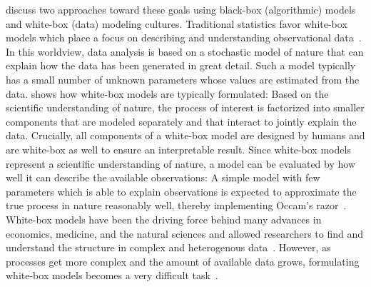 \Textcite{breiman_statistical_2001,shmueli_explain_2010} discuss two approaches toward these goals using black-box (algorithmic) models and white-box (data) modeling cultures.
Traditional statistics favor white-box models which place a focus on describing and understanding observational data~\parencite{andrew_gelman_bayesian_2013,casella_statistical_2002,cox_planning_1958}.
In this worldview, data analysis is based on a stochastic model of nature that can explain how the data has been generated in great detail.
Such a model typically has a small number of unknown parameters whose values are estimated from the data.
 shows how white-box models are typically formulated:
Based on the scientific understanding of nature, the process of interest is factorized into smaller components that are modeled separately and that interact to jointly explain the data.
Crucially, all components of a white-box model are designed by humans and are white-box as well to ensure an interpretable result.
Since white-box models represent a scientific understanding of nature, a model can be evaluated by how well it can describe the available observations:
A simple model with few parameters which is able to explain observations is expected to approximate the true process in nature reasonably well, thereby implementing Occam's razor~\parencite{thorburn_occams_1915}.
White-box models have been the driving force behind many advances in economics, medicine, and the natural sciences and allowed researchers to find and understand the structure in complex and heterogenous data~\parencite{efron_modern_2005,giulio_d._agostini_bayesian_2003}.
However, as processes get more complex and the amount of available data grows, formulating white-box models becomes a very difficult task~\parencite{sutton_bitter_2019}.

